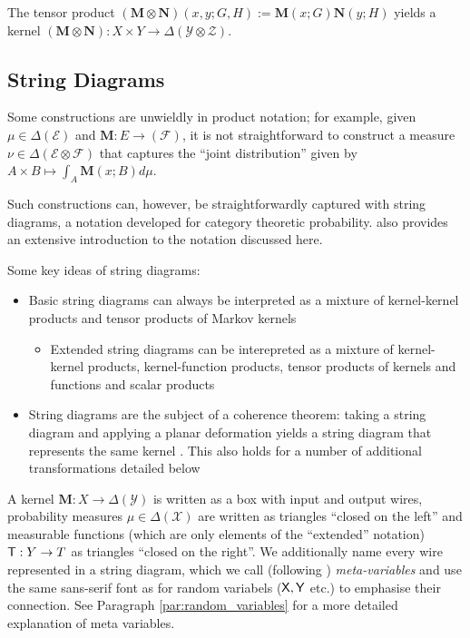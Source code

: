 The tensor product $(\mathbf{M}\otimes \mathbf{N})(x,y;G,H) := \mathbf{M}(x;G)\mathbf{N}(y;H)$ yields a kernel $(\mathbf{M}\otimes \mathbf{N}):X\times Y\to \Delta(\mathcal{Y}\otimes\mathcal{Z})$.

\subsection{String Diagrams}

Some constructions are unwieldly in product notation; for example, given $\mu\in \Delta(\mathcal{E})$ and $\mathbf{M}:E\to (\mathcal{F})$, it is not straightforward to construct a measure $\nu\in\Delta(\mathcal{E}\otimes\mathcal{F})$ that captures the ``joint distribution'' given by $A\times B\mapsto \int_A \mathbf{M}(x;B)d\mu$. 

Such constructions can, however, be straightforwardly captured with string diagrams, a notation developed for category theoretic probability. \citet{cho_disintegration_2019} also provides an extensive introduction to the notation discussed here.

Some key ideas of string diagrams:
\begin{itemize}
	\item Basic string diagrams can always be interpreted as a mixture of kernel-kernel products and tensor products of Markov kernels
	\begin{itemize}
	\item Extended string diagrams can be interepreted as a mixture of kernel-kernel products, kernel-function products, tensor products of kernels and functions and scalar products 
	\end{itemize}
	\item String diagrams are the subject of a coherence theorem: taking a string diagram and applying a planar deformation yields a string diagram that represents the same kernel \citep{selinger_survey_2010}. This also holds for a number of additional transformations detailed below
\end{itemize}

A kernel $\mathbf{M}:X\to \Delta(\mathcal{Y})$ is written as a box with input and output wires, probability measures $\mu\in \Delta(\mathcal{X})$ are written as triangles ``closed on the left'' and measurable functions (which are only elements of the ``extended'' notation) $\mathsf{T}:Y\to T$ as triangles ``closed on the right''. We additionally name every wire represented in a string diagram, which we call (following \cite{cho_disintegration_2019}) \emph{meta-variables} and use the same sans-serif font as for random variabels ($\mathsf{X},\mathsf{Y}$ etc.) to emphasise their connection. See Paragraph \ref{par:random_variables} for a more detailed explanation of meta variables.


